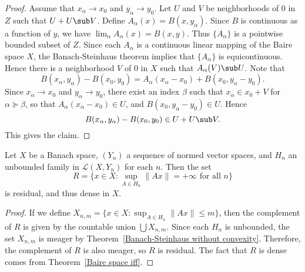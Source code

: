 \begin{proof}
Assume that $x_\alpha\to x_0$ and $y_\alpha\to y_0$. Let $U$ and $V$ be neighborhoods of $0$ in $Z$ such that $U+U\sub V$. Define $A_\alpha(x)=B(x,y_\alpha)$. Since $B$ is continuous as a function of $y$, we have $\lim_\alpha A_\alpha(x)=B(x,y)$. Thus $\{A_\alpha\}$ is a pointwise bounded subset of $Z$. Since each $A_\alpha$ is a continuous linear mapping of the Baire space $X$, the Banach-Steinhaus theorem implies that $\{A_\alpha\}$ is equicontinuous. Hence there is a neighborhood $V$ of $0$ in $X$ such that $A_\alpha(V)\sub U$. Note that
\[B(x_\alpha,y_\alpha)-B(x_0,y_0)=A_\alpha(x_\alpha-x_0)+B(x_0,y_\alpha-y_0).\]
Since $x_\alpha\to x_0$ and $y_\alpha\to y_0$, there exist an index $\beta$ such that $x_\alpha\in x_0+V$ for $\alpha\succeq\beta$, so that $A_\alpha(x_\alpha-x_0)\in U$, and $B(x_0,y_\alpha-y_0)\in U$. Hence
\[B(x_\alpha,y_\alpha)-B(x_0,y_0)\in U+U\sub V.\]
This gives the claim.
\end{proof}
\begin{proposition}
Let $X$ be a Banach space, $(Y_n)$ a sequence of normed vector spaces, and $H_n$ an unbounded family in $\mathcal{L}(X,Y_n)$ for each $n$. Then the set
\[R=\{x\in X:\sup_{A\in H_n}\|Ax\|=+\infty\text{ for all $n$}\}\]
is residual, and thus dense in $X$.
\end{proposition}
\begin{proof}
If we define $X_{n,m}=\{x\in X:\sup_{A\in H_n}\|Ax\|\leq m\}$, then the complement of $R$ is given by the countable union $\bigcup X_{n,m}$. Since each $H_n$ is unbounded, the set $X_{n,m}$ is meager by Theorem~\ref{Banach-Steinhaus without convexity}. Therefore, the complement of $R$ is also meager, so $R$ is residual. The fact that $R$ is dense comes from Theorem~\ref{Baire space iff}.
\end{proof}

